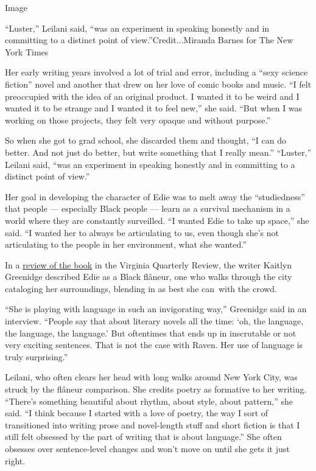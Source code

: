 Image

``Luster,'' Leilani said, ``was an experiment in speaking honestly and
in committing to a distinct point of view.''Credit...Miranda Barnes for
The New York Times

Her early writing years involved a lot of trial and error, including a
``sexy science fiction'' novel and another that drew on her love of
comic books and music. ``I felt preoccupied with the idea of an original
product. I wanted it to be weird and I wanted it to be strange and I
wanted it to feel new,'' she said. ``But when I was working on those
projects, they felt very opaque and without purpose.''

So when she got to grad school, she discarded them and thought, ``I can
do better. And not just do better, but write something that I really
mean.'' ``Luster,'' Leilani said, ``was an experiment in speaking
honestly and in committing to a distinct point of view.''

Her goal in developing the character of Edie was to melt away the
``studiedness'' that people --- especially Black people --- learn as a
survival mechanism in a world where they are constantly surveilled. ``I
wanted Edie to take up space,'' she said. ``I wanted her to always be
articulating to us, even though she's not articulating to the people in
her environment, what she wanted.''

In a
\href{https://www.vqronline.org/fiction-criticism/2020/06/sex-city}{review
of the book} in the Virginia Quarterly Review, the writer Kaitlyn
Greenidge described Edie as a Black flâneur, one who walks through the
city cataloging her surroundings, blending in as best she can~with the
crowd.

``She is playing with language in such an invigorating way,'' Greenidge
said in an interview. ``People say that about literary novels all the
time: `oh, the language, the language, the language.' But oftentimes
that ends up in inscrutable or not very exciting sentences. That is not
the case with Raven. Her use of language is truly surprising.''

Leilani, who often clears her head with long walks around New York City,
was struck by the flâneur comparison. She credits poetry as formative to
her writing. ``There's something beautiful about rhythm, about style,
about pattern,'' she said. ``I think because I started with a love of
poetry, the way I sort of transitioned into writing prose and
novel-length stuff and short fiction is that I still felt obsessed by
the part of writing that is about language.'' She often obsesses over
sentence-level changes and won't move on until she gets it just right.

